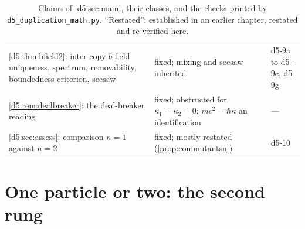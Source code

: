 \begin{table}[t]
\begin{tabular}{@{}>{\raggedright\arraybackslash}p{8.1cm}>{\raggedright\arraybackslash}p{5.0cm}>{\raggedright\arraybackslash}p{2.0cm}@{}}
\cref{d5:thm:bfield2}: inter-copy $b$-field: uniqueness, spectrum, removability, boundedness criterion, seesaw & fixed; mixing and seesaw inherited & d5-9a to d5-9e, d5-9g\\
\cref{d5:rem:dealbreaker}: the deal-breaker reading & fixed; obstructed for $\kappa_1=\kappa_2=0$; $mc^2=\hbar\kappa$ an identification & ---\\
\cref{d5:sec:assess}: comparison $n=1$ against $n=2$ & fixed; mostly restated (\cref{prop:commutantsn}) & d5-10\\
\bottomrule
\end{tabular}
\caption{Claims of \cref{d5:sec:main}, their classes, and the checks printed by \texttt{d5\_duplication\_math.py}. ``Restated'': established in an earlier chapter, restated and re-verified here.}
\label{d5:tab:claims}
\end{table}


\section{One particle or two: the second rung}
\label{e1:sec:main}

